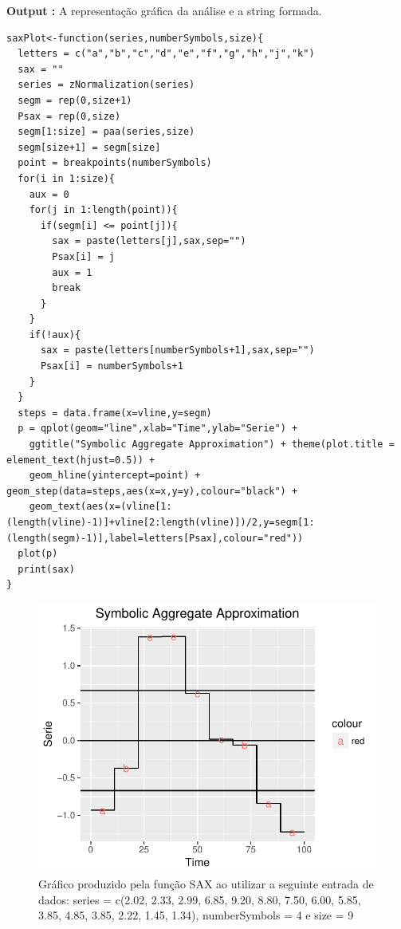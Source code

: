 \documentclass[12pt,letterpaper]{article}
\begin{document}
\textbf{Output :} A representação gráfica da análise e a string formada.\\

\begin{lstlisting}
saxPlot<-function(series,numberSymbols,size){
  letters = c("a","b","c","d","e","f","g","h","j","k")
  sax = ""
  series = zNormalization(series)
  segm = rep(0,size+1)
  Psax = rep(0,size)
  segm[1:size] = paa(series,size)
  segm[size+1] = segm[size]
  point = breakpoints(numberSymbols)
  for(i in 1:size){
    aux = 0
    for(j in 1:length(point)){ 
      if(segm[i] <= point[j]){
        sax = paste(letters[j],sax,sep="")
        Psax[i] = j
        aux = 1
        break
      }
    }
    if(!aux){ 
      sax = paste(letters[numberSymbols+1],sax,sep="")
      Psax[i] = numberSymbols+1
    }
  }
  steps = data.frame(x=vline,y=segm)
  p = qplot(geom="line",xlab="Time",ylab="Serie") +
    ggtitle("Symbolic Aggregate Approximation") + theme(plot.title = element_text(hjust=0.5)) +
    geom_hline(yintercept=point) + geom_step(data=steps,aes(x=x,y=y),colour="black") +
    geom_text(aes(x=(vline[1:(length(vline)-1)]+vline[2:length(vline)])/2,y=segm[1:(length(segm)-1)],label=letters[Psax],colour="red"))
  plot(p)
  print(sax)
}
\end{lstlisting}

\begin{figure}[!hbt]
	\begin{center}
		\includegraphics[width=\columnwidth]{SAX.pdf}
		\caption{Gráfico produzido pela função SAX ao utilizar a seguinte entrada de dados: series = c(2.02, 2.33, 2.99, 6.85, 9.20, 8.80, 7.50, 6.00, 5.85, 3.85, 4.85, 3.85, 2.22, 1.45, 1.34), numberSymbols = 4 e size = 9}
		\label{fig:SAX.pdf}
	\end{center}
\end{figure}
\end{document}
